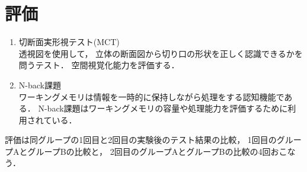 \section{評価}
  \begin{enumerate}
    \item 切断面実形視テスト(MCT)\cite{MCT} \mbox{}\\
      透視図を使用して，
      立体の断面図から切り口の形状を正しく認識できるかを問うテスト．
      空間視覚化能力を評価する．
    \item N-back課題 \mbox{}\\
      ワーキングメモリは情報を一時的に保持しながら処理をする認知機能である．
      N-back課題はワーキングメモリの容量や処理能力を評価するために利用されている\cite{N-back}．
  \end{enumerate}

  評価は同グループの1回目と2回目の実験後のテスト結果の比較，
  1回目のグループAとグループBの比較と，
  2回目のグループAとグループBの比較の4回おこなう．
